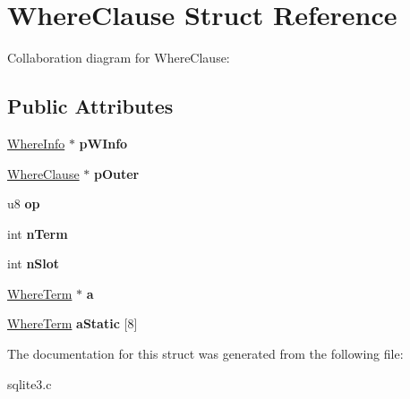 \hypertarget{structWhereClause}{}\section{Where\+Clause Struct Reference}
\label{structWhereClause}


Collaboration diagram for Where\+Clause\+:
\subsection*{Public Attributes}
\begin{DoxyCompactItemize}
\item 
\hyperlink{structWhereInfo}{Where\+Info} $\ast$ {\bfseries p\+W\+Info}\hypertarget{structWhereClause_a40045b5806b481237c7fc4c0e21cd29b}{}\label{structWhereClause_a40045b5806b481237c7fc4c0e21cd29b}

\item 
\hyperlink{structWhereClause}{Where\+Clause} $\ast$ {\bfseries p\+Outer}\hypertarget{structWhereClause_a6f72d61f416a323f39a8d3e2be62f607}{}\label{structWhereClause_a6f72d61f416a323f39a8d3e2be62f607}

\item 
u8 {\bfseries op}\hypertarget{structWhereClause_a7a56a5fe1ab6603e930f3b5372ff2f71}{}\label{structWhereClause_a7a56a5fe1ab6603e930f3b5372ff2f71}

\item 
int {\bfseries n\+Term}\hypertarget{structWhereClause_ab84924c3c78af1ab387ab3919c5031c4}{}\label{structWhereClause_ab84924c3c78af1ab387ab3919c5031c4}

\item 
int {\bfseries n\+Slot}\hypertarget{structWhereClause_ac92b93d65d4c3d9216707a049a4edb1c}{}\label{structWhereClause_ac92b93d65d4c3d9216707a049a4edb1c}

\item 
\hyperlink{structWhereTerm}{Where\+Term} $\ast$ {\bfseries a}\hypertarget{structWhereClause_a140d726a3e20ac7b6853d539c59add72}{}\label{structWhereClause_a140d726a3e20ac7b6853d539c59add72}

\item 
\hyperlink{structWhereTerm}{Where\+Term} {\bfseries a\+Static} \mbox{[}8\mbox{]}\hypertarget{structWhereClause_a4acb8640bc9f42752900de5735bcd8e0}{}\label{structWhereClause_a4acb8640bc9f42752900de5735bcd8e0}

\end{DoxyCompactItemize}


The documentation for this struct was generated from the following file\+:\begin{DoxyCompactItemize}
\item 
sqlite3.\+c\end{DoxyCompactItemize}
